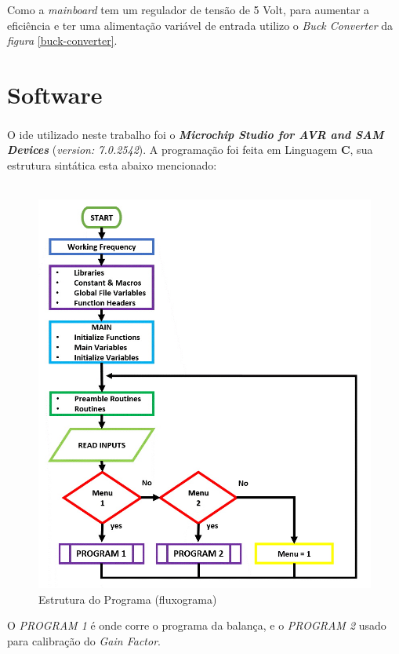 Como a \textit{mainboard} tem um regulador de tensão de 5 Volt, para aumentar a eficiência  e ter uma alimentação variável de entrada utilizo o \textit{Buck Converter} da \textit{figura} \ref{buck-converter}.
\chapter{Software}
O \ac{ide} utilizado neste trabalho foi o \textbf{\textit{{Microchip Studio for AVR\textsuperscript{\textregistered} and SAM Devices}}} (\textit{version: 7.0.2542}). A programação foi feita em Linguagem \textbf{C}, sua estrutura sintática esta abaixo mencionado:
\\
\\
\begin{figure}[H]
	\centering
	\includegraphics[scale=0.6]{./image/PESTA/flowchart/Main_Program_1.jpg}
	\caption{Estrutura do Programa (fluxograma)}
	\label{Main_Program_1}
\end{figure}
O \textit{PROGRAM 1} é onde corre o programa da balança, e o \textit{PROGRAM 2} usado para calibração do \textit{Gain Factor}.
\\
\\
